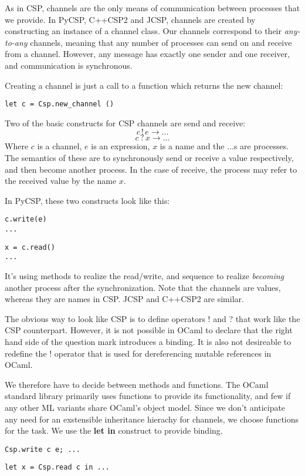 \documentclass[a4paper,12pt]{article}
\begin{document}
As in CSP, channels are the only means of communication between processes that we provide.
In PyCSP, C++CSP2 and JCSP, channels are created by constructing an instance of a channel
class. Our channels correspond to their \emph{any-to-any} channels, meaning that any number
of processes can send on and receive from a channel. However, any message has exactly 
one sender and one receiver, and communication is synchronous.

Creating a channel is just a call to a function which returns the new channel:
\begin{verbatim}
let c = Csp.new_channel ()
\end{verbatim}

Two of the basic constructs for CSP channels are send and receive:
\[c\,!\,e \to ...\]
\[c\,?\,x \to ...\]
Where $c$ is a channel, $e$ is an expression, $x$ is a name and the $...$s are processes. 
The semantics of these are to synchronously send or receive a value respectively, and
then become another process. In the case of receive, the process may refer to the
received value by the name $x$.

In PyCSP, these two constructs look like this:
\begin{verbatim}
c.write(e)
...
\end{verbatim}
\begin{verbatim}
x = c.read()
...
\end{verbatim}
It's using methods to realize the read/write, and sequence to realize \emph{becoming}
another process after the synchronization. Note that the channels are values, whereas
they are names in CSP. JCSP and C++CSP2 are similar.

The obvious way to look like CSP is to define operators ! and ? that work like the
CSP counterpart. However, it is not possible in OCaml to declare that the right hand 
side of the question mark introduces a binding. It is also not desireable to redefine
the ! operator that is used for dereferencing mutable references in OCaml.

We therefore have to decide between methods and functions. The OCaml standard library
primarily uses functions to provide its functionality, and few if any other ML 
variants share OCaml's object model. Since we don't anticipate any need for an
exstensible inheritance hierachy for channels, we choose functions for the task.
We use the \textbf{let in} construct to provide binding.

\begin{verbatim}
Csp.write c e; ...
\end{verbatim}
\begin{verbatim}
let x = Csp.read c in ...
\end{verbatim}
\end{document}
